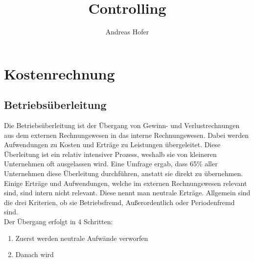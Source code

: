 \documentclass{article}
\title{\vspace{-1cm}Controlling}
\author{Andreas Hofer}
\begin{document}
	\maketitle
	\tableofcontents
	\section{Kostenrechnung}
	\subsection{Betriebsüberleitung}
	Die Betriebsüberleitung ist der Übergang von Gewinn- und Verlustrechnungen aus dem externen Rechnungswesen in das interne Rechnungswesen. Dabei werden Aufwendungen zu Kosten und Erträge zu Leistungen übergeleitet. Diese Überleitung ist ein relativ intensiver Prozess, weshalb sie von kleineren Unternehmen oft ausgelassen wird. Eine Umfrage ergab, dass 65\% aller Unternehmen diese Überleitung durchführen, anstatt sie direkt zu übernehmen. \\
	Einige Erträge und Aufwendungen, welche im externen Rechnungswesen relevant sind, sind intern nicht relevant. Diese nennt man neutrale Erträge. Allgemein sind die drei Kriterien, ob sie Betriebsfremd, Außerordentlich oder Periodenfremd sind. \\
	Der Übergang erfolgt in 4 Schritten:
	\begin{enumerate}
		\item{Zuerst werden neutrale Aufwände verworfen}
		\item{Danach wird}
	\end{enumerate}
\end{document}
